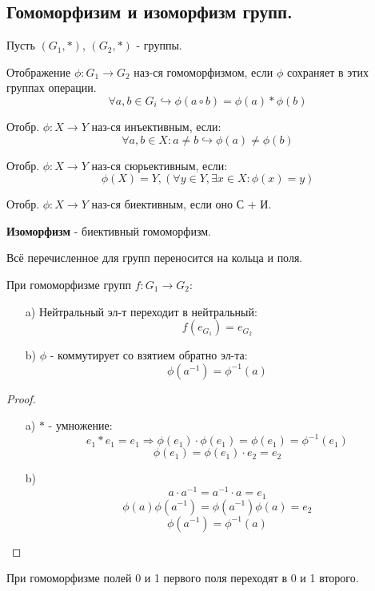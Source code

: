 \subsection{Гомоморфизим и изоморфизм групп.}
Пусть $(G_1, *)$, $(G_2, *)$ - группы.
\begin{definition}
Отображение $\phi: G_1 \rightarrow G_2$ наз-ся гомоморфизмом, если $\phi$ сохраняет в этих группах операции.
\[
\forall a, b \in G_i \hookrightarrow \phi(a \circ b) = \phi(a) * \phi(b)
\]
\end{definition}
\begin{definition}
  Отобр. $\phi: X \rightarrow Y$ наз-ся инъективным, если:
  \[
  \forall a, b \in X \colon a \neq b \hookrightarrow \phi(a) \neq \phi(b)
  \]
\end{definition}
\begin{definition}
  Отобр. $\phi: X \rightarrow Y$ наз-ся сюрьективным, если:
  \[
  \phi(X) = Y, (\forall y \in Y, \exists x \in X \colon \phi(x) = y)
  \]
\end{definition}
\begin{definition}
  Отобр. $\phi \colon X \rightarrow Y$  наз-ся биективным, если оно С + И.
\end{definition}
\begin{definition}
  \textbf{Изоморфизм} - биективный гомоморфизм.
\end{definition}
\begin{note}
Всё перечисленное для групп переносится на кольца и поля.
\end{note}
\begin{statement}
При гомоморфизме групп $f: G_1 \rightarrow G_2$:
\begin{itemize}
  \item [a) ] Нейтральный эл-т переходит в нейтральный:
    \[
    f(e_{G_1}) = e_{G_2}
    \]
  \item [b) ] $\phi$ - коммутирует со взятием обратно эл-та:
    \[
    \phi(a^{-1}) = \phi^{-1}(a)
    \]
\end{itemize}
\end{statement}
\begin{proof}
\begin{itemize}
  \item [a) ] $*$ - умножение:
    \[
    e_1 * e_1 = e_1 \Rightarrow \phi(e_1) \cdot \phi(e_1) = \phi(e_1) = \phi^{-1}(e_1)
    \]
    \[
    \phi(e_1) = \phi(e_1) \cdot e_2 = e_2
    \]
  \item [b) ] \[
  a \cdot a^{-1} = a^{-1} \cdot a = e_1
  \]
  \[
  \phi(a) \phi(a^{-1}) = \phi(a^{-1}) \phi(a) = e_2
  \]
  \[
  \phi(a^{-1}) = \phi^{-1}(a)
  \]
\end{itemize}
\end{proof}
\begin{consequence}
При гомоморфизме полей 0 и 1 первого поля переходят в 0 и 1 второго.
\end{consequence}
